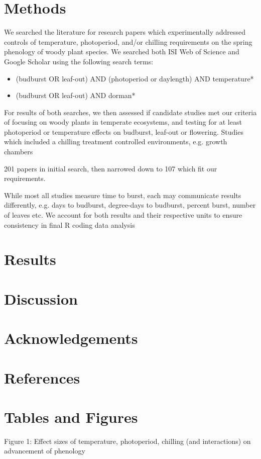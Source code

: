 \documentclass[11pt]{article}
\begin{document}
\section*{Methods}

We searched the literature for research papers which experimentally addressed controls of temperature, photoperiod, and/or chilling requirements on the spring phenology of woody plant species. We searched both ISI Web of Science and Google Scholar using the following search terms:
\begin{itemize}
\item{ (budburst OR leaf-out) AND (photoperiod or daylength) AND temperature* }
\item{ (budburst OR leaf-out) AND dorman*  }
\end{itemize}

For results of both searches, we then assessed if candidate studies met our criteria of focusing on woody plants in temperate ecosystems, and testing for at least photoperiod or temperature effects on budburst, leaf-out or flowering. Studies which included a chilling treatment 
 controlled environments, e.g. growth chambers
 
 201 papers in initial search, then narrowed down to 107 which fit our requirements.
 
 While most all studies measure time to burst, each may communicate results differently, e.g. days to budburst, degree-days to budburst, percent burst, number of leaves etc.
We account for both results and their respective units to ensure consistency in final R coding data analysis



\section*{Results}

\section*{Discussion}

\section*{Acknowledgements}

\section*{References}

\section*{Tables and Figures}

Figure 1: Effect sizes of temperature, photoperiod, chilling (and interactions) on advancement of phenology
\end{document}
